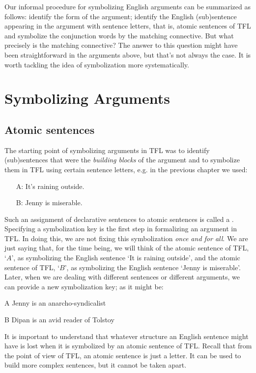 Our informal procedure for symbolizing English arguments can be summarized as follows: identify the form of the argument; identify the English (sub)sentence appearing in the argument with sentence letters, that is, atomic sentences of TFL and symbolize the conjunction words by the matching connective. But what precisely is the matching connective? The answer to this question might have been straightforward in the arguments above, but that's not always the case. It is worth tackling the idea of symbolization more systematically. %

\chapter{Symbolizing Arguments}
\section{Atomic sentences}
The starting point of symbolizing arguments in TFL was to identify (sub)sentences that were the \emph{building blocks} of the argument and to symbolize them in TFL using certain sentence letters, e.g. in the previous chapter we used:
\begin{itemize}
\item[A:]It's raining outside.
\item[B:]Jenny is miserable.
\end{itemize}
Such an assignment of declarative sentences to atomic sentences is called a . Specifying a symbolization key is the first step in formalizing an argument in TFL. In doing this, we are not fixing this symbolization \emph{once and for all}. We are just saying that, for the time being, we will think of the atomic sentence of TFL, `$A$', as symbolizing the English sentence `It is raining outside', and the atomic sentence of TFL, `$B$', as symbolizing the English sentence `Jenny is miserable'. Later, when we are dealing with different sentences or different arguments, we can provide a new symbolization key; as it might be:
	\begin{ekey}
		\item[A] Jenny is an anarcho-syndicalist
		\item[B] Dipan is an avid reader of Tolstoy
	\end{ekey}
It is important to understand that whatever structure an English sentence might have is lost when it is symbolized by an atomic sentence of TFL. Recall that from the point of view of TFL, an atomic sentence is just a letter. It can be used to build more complex sentences, but it cannot be taken apart.

